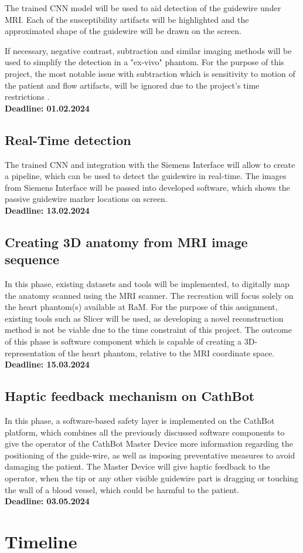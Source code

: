 \documentclass{article}
\begin{document}
The trained CNN model will be used to aid detection of the guidewire under MRI. Each of the susceptibility artifacts will be highlighted and the approximated shape of the guidewire will be drawn on the screen.

If necessary, negative contrast, subtraction and similar imaging methods will be used to simplify the detection in a "ex-vivo" phantom. For the purpose of this project, the most notable issue with subtraction which is sensitivity to motion of the patient and flow artifacts, will be ignored due to the project's time restrictions \cite{passive-tracking-white-marker}.\\
\textbf{Deadline: 01.02.2024}
\newpage
\subsection{Real-Time detection}
The trained CNN and integration with the Siemens Interface will allow to create a pipeline, which can be used to detect the guidewire in real-time. The images from Siemens Interface will be passed into developed software, which shows the passive guidewire marker locations on screen.\\
\textbf{Deadline: 13.02.2024}

\subsection{Creating 3D anatomy from MRI image sequence}
In this phase, existing datasets and tools will be implemented, to digitally map the anatomy scanned using the MRI scanner. The recreation will focus solely on the heart phantom(s) available at RaM. For the purpose of this assignment, existing tools such as Slicer\cite{slicer}  will be used, as developing a novel reconstruction method is not be viable due to the time constraint of this project. The outcome of this phase is software component which is capable of creating a 3D-representation of the heart phantom, relative to the MRI coordinate space.\\
\textbf{Deadline: 15.03.2024}

\subsection{Haptic feedback mechanism on CathBot}
In this phase, a software-based safety layer is implemented on the CathBot platform, which combines all the previously discussed software components to give the operator of the CathBot Master Device more information regarding the positioning of the guide-wire, as well as imposing preventative measures to avoid damaging the patient. The Master Device will give haptic feedback to the operator, when the tip or any other visible guidewire part is dragging or touching the wall of a blood vessel, which could be harmful to the patient.\\
\textbf{Deadline: 03.05.2024}

\newpage
\section{Timeline}





\end{document}

